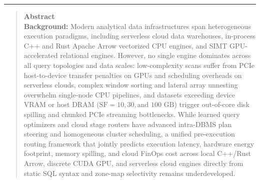 \documentclass[10pt,a4paper]{article}
\begin{document}
\noindent\rule{\textwidth}{0.8pt}
\begin{quote}
\small\sffamily
\textbf{\color{springerblue}Abstract}\\[0.3em]
\textbf{Background:} Modern analytical data infrastructures span heterogeneous execution paradigms, including serverless cloud data warehouses, in-process C++ and Rust Apache Arrow vectorized CPU engines, and SIMT GPU-accelerated relational engines. However, no single engine dominates across all query topologies and data scales: low-complexity scans suffer from PCIe host-to-device transfer penalties on GPUs and scheduling overheads on serverless clouds, complex window sorting and lateral array unnesting overwhelm single-node CPU pipelines, and datasets exceeding device VRAM or host DRAM ($\text{SF}=10, 30, \text{and } 100\text{ GB}$) trigger out-of-core disk spilling and chunked PCIe streaming bottlenecks. While learned query optimizers and cloud stage routers have advanced intra-DBMS plan steering and homogeneous cluster scheduling, a unified pre-execution routing framework that jointly predicts execution latency, hardware energy footprint, memory spilling, and cloud FinOps cost across local C++/Rust Arrow, discrete CUDA GPU, and serverless cloud engines directly from static SQL syntax and zone-map selectivity remains underdeveloped.\\[0.25em]

\end{quote}
\end{document}
